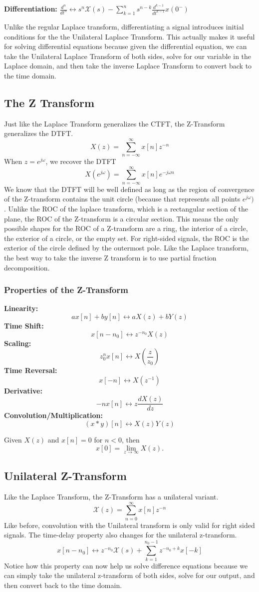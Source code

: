 \textbf{Differentiation:} $\frac{d^n}{dt^n}\leftrightarrow s^n\mathcal{X}(s)-\sum_{k=1}^{n}{s^{n-k}\frac{d^{k-1}}{dt^{k-1}}x(0^-)}$

Unlike the regular Laplace transform, differentiating a signal introduces initial conditions for the the Unilateral Laplace Transform. This actually makes it useful
for solving differential equations because given the differential equation, we can take the Unilateral Laplace Transform of both sides, solve for our variable in the Laplace domain,
and then take the inverse Laplace Transform to convert back to the time domain.
\subsection{The Z Transform}
Just like the Laplace Transform generalizes the CTFT, the Z-Transform generalizes the DTFT.
\[
X(z) = \sum_{n=-\infty}^{\infty}{x[n]z^{-n}}
\]
When $z = e^{j\omega}$, we recover the DTFT
\[
X(e^{j\omega})=\sum_{n=-\infty}^{\infty}{x[n]e^{-j\omega n}}
\]
We know that the DTFT will be well defined as long as the region of convergence of the Z-transform contains the unit circle (because that represents all points $e^{j\omega})$.
Unlike the ROC of the laplace transform, which is a rectangular section of the plane, the ROC of the Z-transform is a circular section.
This means the only possible shapes for the ROC of a Z-transform are a ring, the interior of a circle, the exterior of a circle, or the empty set.
For right-sided signals, the ROC is the exterior of the circle defined by the outermost pole. Like the Laplace transform, the best way to take the inverse Z transform is to use partial fraction decomposition.
\subsubsection{Properties of the Z-Transform}
\textbf{Linearity: } 
\[
ax[n] + by[n] \leftrightarrow aX(z) + bY(z)
\]
\textbf{Time Shift: }
\[
x[n-n_0] \leftrightarrow z^{-n_0}X(z)
\]
\textbf{Scaling: }
\[
z_0^nx[n] \leftrightarrow X\left(\frac{z}{z_0}\right)
\]
\textbf{Time Reversal: } 
\[
x[-n] \leftrightarrow X(z^{-1})
\]
\textbf{Derivative: } 
\[
-nx[n] \leftrightarrow z\frac{dX(z)}{dz}
\]
\textbf{Convolution/Multiplication: } 
\[
(x*y)[n] \leftrightarrow X(z)Y(z)
\]
\begin{theorem}
    Given $X(z)$ and $x[n]=0$ for $n<0$, then \[
	  x[0] = \lim_{z\rightarrow\infty}{X(z)}.
\]
\end{theorem}
\subsection{Unilateral Z-Transform}
Like the Laplace Transform, the Z-Transform has a unilateral variant.
\[
\mathcal{X}(z) = \sum_{n=0}^{\infty}{x[n]z^{-n}}
\]
Like before, convolution with the Unilateral transform is only valid for right sided signals.
The time-delay property also changes for the unilateral z-transform.
\[
x[n-n_0] \leftrightarrow z^{-n_0}\mathcal{X}(s)+\sum_{k=1}^{n_0-1}{z^{-n_0+k}x[-k]}
\]
Notice how this property can now help us solve difference equations because we can simply take the unilateral z-transform
of both sides, solve for our output, and then convert back to the time domain.
